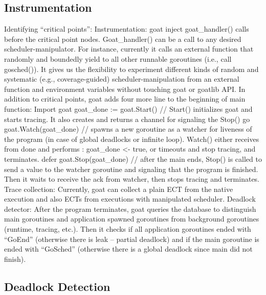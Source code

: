 \subsection{Instrumentation}
\label{sec:instrument}
Identifying “critical points”:
Instrumentation: goat inject goat\_handler() calls before the critical point nodes. Goat\_handler() can be a call to any desired scheduler-manipulator. For instance, currently it calls an external function that randomly and boundedly yield to all other runnable goroutines (i.e., call gosched()). It gives us the flexibility to experiment different kinds of random and systematic (e.g., coverage-guided) scheduler-manipulation from an external function and environment variables without touching goat or goatlib API. In addition to critical points, goat adds four more line to the beginning of main function:
Import goat
goat\_done := goat.Start() // Start() initializes goat and starts tracing. It also creates and returns a channel for signaling the Stop()
go goat.Watch(goat\_done) // spawns a new goroutine as a watcher for liveness of the program (in case of global deadlocks or infinite loop). Watch() either receives from done and performs : goat\_done <- true, or timeouts and stop tracing, and terminates.
defer goat.Stop(goat\_done) // after the main ends, Stop() is called to send a value to the watcher goroutine and signaling that the program is finished. Then it waits to receive the ack from watcher, then stops tracing and terminates.
Trace collection: Currently, goat can collect a plain ECT from the native execution and also ECTs from executions with manipulated scheduler.
Deadlock detector: After the program terminates, goat queries the database to distinguish main goroutines and application spawned goroutines from background goroutines (runtime, tracing, etc.). Then it checks if all application goroutines ended with “GoEnd” (otherwise there is leak – partial deadlock) and if the main goroutine is ended with “GoSched” (otherwise there is a global deadlock since main did not finish).


\subsection{Deadlock Detection}
\label{sec:deadlock}

